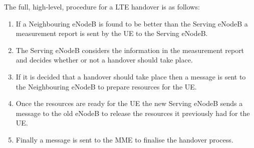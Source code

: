 The full, high-level, procedure for a LTE handover is as follows:
\begin{enumerate}
	\item If a Neighbouring eNodeB is found to be better than the Serving eNodeB a measurement report is sent by the UE to the Serving eNodeB.
	\item The Serving eNodeB considers the information in the measurement report and decides whether or not a handover should take place.
	\item If it is decided that a handover should take place then a message is sent to the Neighbouring eNodeB to prepare resources for the UE.
	\item Once the resources are ready for the UE the new Serving eNodeB sends a message to the old eNodeB to release the resources it previously had for the UE.
	\item Finally a message is sent to the MME to finalise the handover process.
\end{enumerate}
